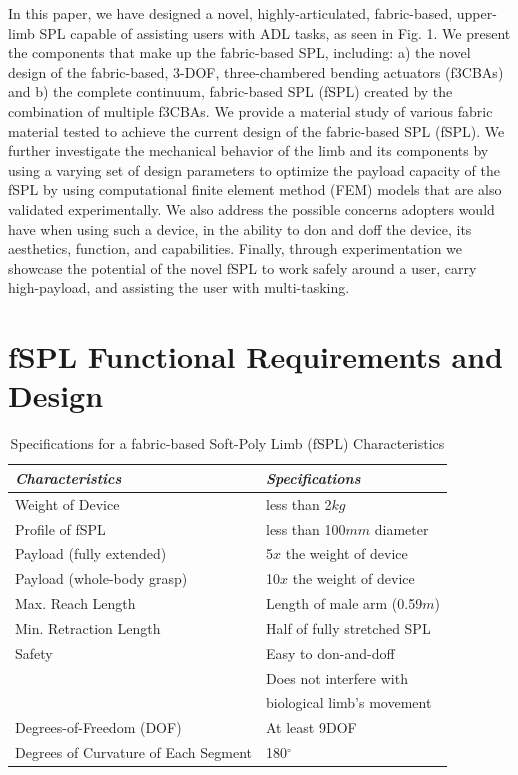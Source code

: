 \documentclass[letterpaper, 10 pt, conference]{ieeeconf}  %
\begin{document}
In this paper, we have designed a novel, highly-articulated, fabric-based, upper-limb SPL capable of assisting users with ADL tasks, as seen in Fig. 1. We present the components that make up the fabric-based SPL, including: a) the novel design of the fabric-based, 3-DOF, three-chambered bending actuators (f3CBAs) and b) the complete continuum, fabric-based SPL (fSPL) created by the combination of multiple f3CBAs. We provide a material study of various fabric material tested to achieve the current design of the fabric-based SPL (fSPL). We further investigate the mechanical behavior of the limb and its components by using a varying set of design parameters to optimize the payload capacity of the fSPL by using computational finite element method (FEM) models that are also validated experimentally. We also address the possible concerns adopters would have when using such a device, in the ability to don and doff the device, its aesthetics, function, and capabilities. Finally, through experimentation we showcase the potential of the novel fSPL to work safely around a user, carry high-payload, and assisting the user with multi-tasking. 


\section{fSPL Functional Requirements and Design}

\begin{table}[t!]
\caption{Specifications for a fabric-based Soft-Poly Limb (fSPL) Characteristics} 
\label{tab:spec_table}
	\begin{tabularx}{0.48\textwidth}{*2l}    \toprule\toprule
	\textbf{\emph{Characteristics}} & \textbf{\emph{Specifications}} \\\midrule
	Weight of Device    & less than 2$kg$  \\ 
	Profile of fSPL & less than 100$mm$ diameter \\ 
	Payload (fully extended)    & 5$x$ the weight of device  \\ 
	Payload (whole-body grasp) & 10$x$ the weight of device \\ 
	Max. Reach Length    & Length of male arm (0.59$m$)  \\ 
	Min. Retraction Length & Half of fully stretched SPL \\ 
	Safety    & Easy to don-and-doff \\ 
	 &Does not interfere with\\
     &biological limb's movement\\
	Degrees-of-Freedom (DOF) & At least 9DOF \\ 
	Degrees of Curvature of Each Segment & 180$^{\circ}$ \\\bottomrule
	 \hline
	\end{tabularx}
\end{table}
\end{document}
